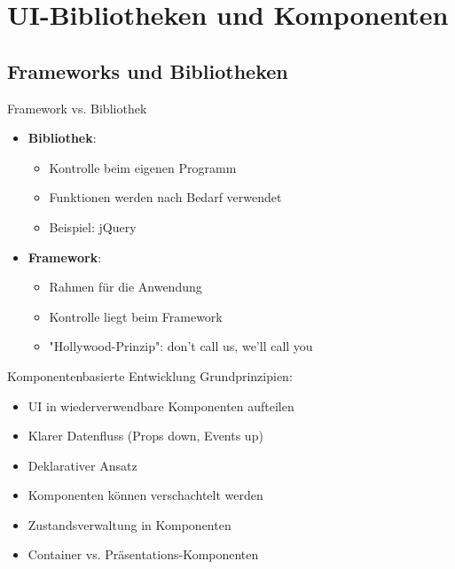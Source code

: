 \section{UI-Bibliotheken und Komponenten}

\subsection{Frameworks und Bibliotheken}

\begin{definition}{Framework vs. Bibliothek}
    \begin{itemize}
        \item \textbf{Bibliothek}: 
            \begin{itemize}
                \item Kontrolle beim eigenen Programm
                \item Funktionen werden nach Bedarf verwendet
                \item Beispiel: jQuery
            \end{itemize}
        \item \textbf{Framework}: 
            \begin{itemize}
                \item Rahmen für die Anwendung
                \item Kontrolle liegt beim Framework
                \item "Hollywood-Prinzip": don't call us, we'll call you
            \end{itemize}
    \end{itemize}
\end{definition}

\begin{concept}{Komponentenbasierte Entwicklung}
    Grundprinzipien:
    \begin{itemize}
        \item UI in wiederverwendbare Komponenten aufteilen
        \item Klarer Datenfluss (Props down, Events up)
        \item Deklarativer Ansatz
        \item Komponenten können verschachtelt werden
        \item Zustandsverwaltung in Komponenten
        \item Container vs. Präsentations-Komponenten
    \end{itemize}
\end{concept}


